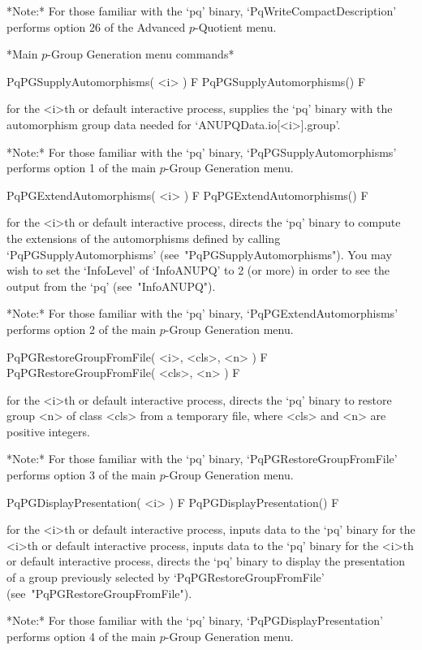 *Note:* 
For those familiar  with  the  `pq'  binary,  `PqWriteCompactDescription'
performs option 26 of the Advanced $p$-Quotient menu.

*Main $p$-Group Generation menu commands*

\>PqPGSupplyAutomorphisms( <i> ) F
\>PqPGSupplyAutomorphisms() F

for the <i>th or default interactive {\ANUPQ} process, supplies the  `pq'
binary    with    the    automorphism    group    data     needed     for
`ANUPQData.io[<i>].group'.

*Note:*
For  those  familiar  with  the  `pq'  binary,  `PqPGSupplyAutomorphisms'
performs option 1 of the main $p$-Group Generation menu.

\>PqPGExtendAutomorphisms( <i> ) F
\>PqPGExtendAutomorphisms() F

for the <i>th or default interactive {\ANUPQ} process, directs  the  `pq'
binary to compute the extensions of the automorphisms defined by  calling
`PqPGSupplyAutomorphisms' (see~"PqPGSupplyAutomorphisms"). You  may  wish
to set the `InfoLevel' of `InfoANUPQ' to 2 (or more) in order to see  the
output from the `pq' (see~"InfoANUPQ").

*Note:*    
For  those  familiar  with  the  `pq'  binary,  `PqPGExtendAutomorphisms'
performs option 2 of the main $p$-Group Generation menu. 

\>PqPGRestoreGroupFromFile( <i>, <cls>, <n> ) F
\>PqPGRestoreGroupFromFile( <cls>, <n> ) F

for the <i>th or default interactive {\ANUPQ} process, directs  the  `pq'
binary to restore group <n> of class <cls> from a temporary  file,  where
<cls> and <n> are positive integers.

*Note:* 
For those  familiar  with  the  `pq'  binary,  `PqPGRestoreGroupFromFile'
performs option 3 of the main $p$-Group Generation menu.

\>PqPGDisplayPresentation( <i> ) F
\>PqPGDisplayPresentation() F

for the <i>th or default interactive {\ANUPQ} process, inputs data to the
`pq' binary for the <i>th or default interactive {\ANUPQ} process, inputs
data to the `pq' binary for the <i>th  or  default  interactive  {\ANUPQ}
process, directs the `pq' binary to display the presentation of  a  group
previously         selected         by         `PqPGRestoreGroupFromFile'
(see~"PqPGRestoreGroupFromFile").

*Note:*
For  those  familiar  with  the  `pq'  binary,  `PqPGDisplayPresentation'
performs option 4 of the main $p$-Group Generation menu.

